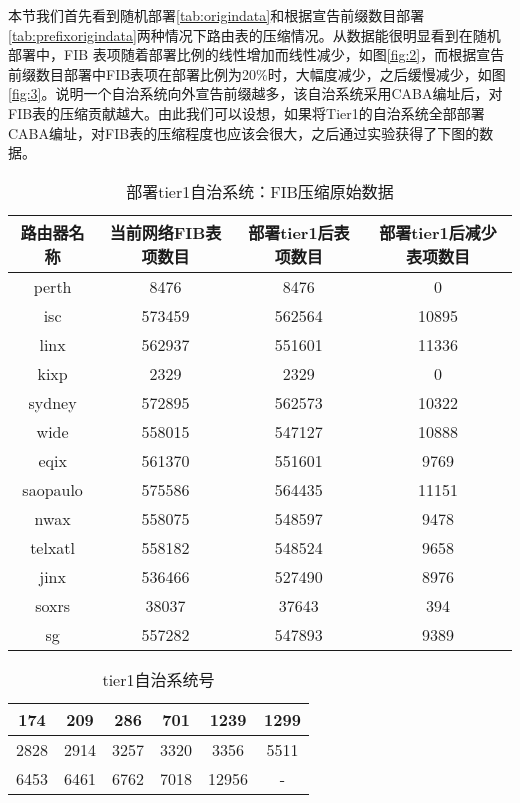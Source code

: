 本节我们首先看到随机部署\ref{tab:origindata}和根据宣告前缀数目部署\ref{tab:prefixorigindata}两种情况下路由表的压缩情况。从数据能很明显看到在随机部署中，FIB 表项随着部署比例的线性增加而线性减少，如图\ref{fig:2}，而根据宣告前缀数目部署中FIB表项在部署比例为20\%时，大幅度减少，之后缓慢减少，如图\ref{fig:3}。说明一个自治系统向外宣告前缀越多，该自治系统采用CABA编址后，对FIB表的压缩贡献越大。由此我们可以设想，如果将Tier1的自治系统全部部署CABA编址，对FIB表的压缩程度也应该会很大，之后通过实验获得了下图的数据。

\begin{table}[h]
    \centering
    \caption{部署tier1自治系统：FIB压缩原始数据}
    \label{tab:tieronefibdata}
    \begin{tabular}{|c|c|c|c|}
    \hline
            路由器名称 & 当前网络FIB表项数目 & 部署tier1后表项数目 & 部署tier1后减少表项数目\\ \hline
            perth    & 8476   & 8476   & 0  \\ \hline
            isc      & 573459 & 562564 & 10895   \\ \hline
            linx     & 562937 & 551601  & 11336   \\ \hline
            kixp     & 2329   & 2329   & 0        \\ \hline
            sydney   & 572895 & 562573 & 10322      \\ \hline
            wide     & 558015 & 547127 &  10888         \\ \hline
            eqix     & 561370 & 551601 & 9769        \\ \hline
            saopaulo & 575586 & 564435 & 11151       \\ \hline
            nwax     & 558075 & 548597  &     9478     \\ \hline
            telxatl  & 558182 & 548524   &  9658      \\ \hline
            jinx     & 536466 & 527490    &     8976    \\ \hline
            soxrs    & 38037  & 37643      &  394   \\ \hline
            sg       & 557282 & 547893    & 9389\\ \hline
    \end{tabular}
\end{table}

\begin{table}
    \centering
    \caption{tier1自治系统号}
    \label{tab:tier1asn}
    \begin{tabular}{|c|c|c|c|c|c|}
    \hline
    174 & 209 & 286 & 701 & 1239 & 1299 \\ \hline
    2828 & 2914 & 3257 & 3320 & 3356 & 5511 \\ \hline
    6453 & 6461 & 6762 & 7018 & 12956 & - \\ \hline
    \end{tabular}
\end{table}

